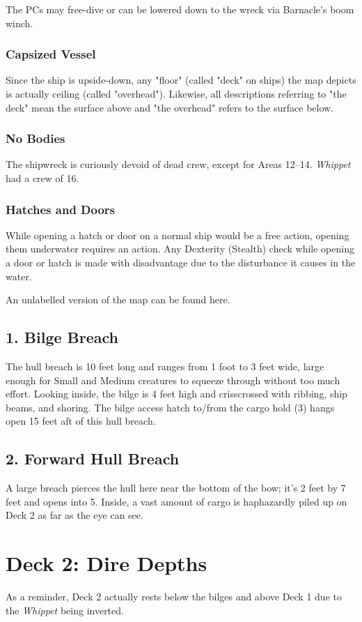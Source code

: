 \documentclass[10pt,a4paper,twoside,bg=print,twocolumn,openany,nodeprecatedcode]{dndbook}
\begin{document}
The PCs may free-dive or can be lowered down to the wreck via Barnacle's boom winch.

\subsubsection{Capsized Vessel}
Since the ship is upside-down, any "floor" (called "deck" on ships) the map depicts is actually ceiling (called "overhead"). Likewise, all descriptions referring to "the deck" mean the surface above and "the overhead" refers to the surface below.

\subsubsection{No Bodies}
The shipwreck is curiously devoid of dead crew, except for Areas 12–14. \textit{Whippet} had a crew of 16.

\subsubsection{Hatches and Doors}
While opening a hatch or door on a normal ship would be a free action, opening them underwater requires an action. Any Dexterity (Stealth) check while opening a door or hatch is made with disadvantage due to the disturbance it causes in the water.

An unlabelled version of the map can be found here.

\subsection{1. Bilge Breach}
The hull breach is 10 feet long and ranges from 1 foot to 3 feet wide, large enough for Small and Medium creatures to squeeze through without too much effort. Looking inside, the bilge is 4 feet high and crisscrossed with ribbing, ship beams, and shoring. The bilge access hatch to/from the cargo hold (3) hangs open 15 feet aft of this hull breach.

\subsection{2. Forward Hull Breach}
A large breach pierces the hull here near the bottom of the bow; it's 2 feet by 7 feet and opens into 5. Inside, a vast amount of cargo is haphazardly piled up on Deck 2 as far as the eye can see.

\section{Deck 2: Dire Depths}
As a reminder, Deck 2 actually rests below the bilges and above Deck 1 due to the \textit{Whippet} being inverted.
\end{document}
